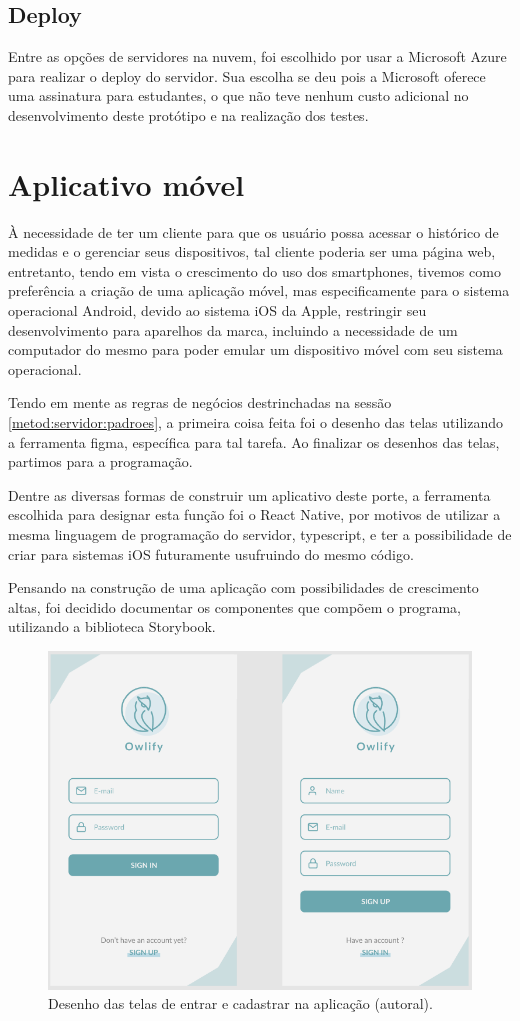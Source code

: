\subsection{Deploy}
\label{metod:servidor:deploy}
Entre as opções de servidores na nuvem, foi escolhido por usar a Microsoft Azure para realizar o deploy do servidor. Sua escolha se deu pois a Microsoft oferece uma assinatura para estudantes, o que não teve nenhum custo adicional no desenvolvimento deste protótipo e na realização dos testes.

\section{Aplicativo móvel}
\label{metod:app}
À necessidade de ter um cliente para que os usuário  possa acessar o histórico de medidas e o gerenciar seus dispositivos, tal cliente poderia ser uma página web, entretanto, tendo em vista o crescimento do uso dos smartphones, tivemos como preferência a criação de uma aplicação móvel, mas especificamente para o sistema operacional Android, devido ao sistema iOS da Apple, restringir seu desenvolvimento para aparelhos da marca, incluindo a necessidade de um computador do mesmo para poder emular um dispositivo móvel com seu sistema operacional.

Tendo em mente as regras de negócios destrinchadas na sessão \ref{metod:servidor:padroes}, a primeira coisa feita foi o desenho das telas utilizando a ferramenta figma, específica para tal tarefa. Ao finalizar os desenhos das telas, partimos para a programação.

Dentre as diversas formas de construir um aplicativo deste porte, a ferramenta escolhida para designar esta função foi o React Native, por motivos de utilizar a mesma linguagem de programação do servidor, typescript, e ter a possibilidade de criar para sistemas iOS futuramente usufruindo do mesmo código.

Pensando na construção de uma aplicação com possibilidades de crescimento altas, foi decidido documentar os componentes que compõem o programa, utilizando a biblioteca Storybook.

\begin{figure}[H]
  \centering
  \includegraphics[width=.80\textwidth]{assets/example-app-screens.png} 
  \caption{Desenho das telas de entrar e cadastrar na aplicação (autoral).}
  \label{fig:app-screns-login} 
\end{figure}